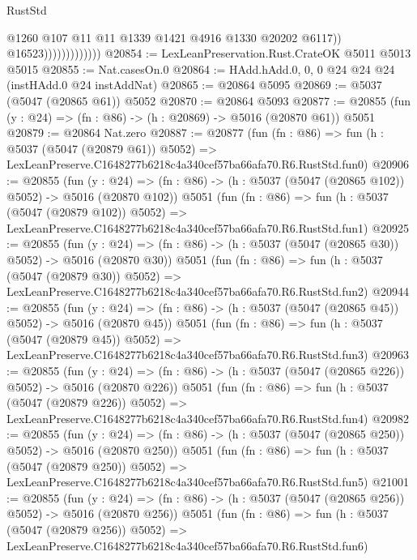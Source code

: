 \begin{lexlean}{RustStd}
\begin{coremodule}
                                  @1260
                                  @107
                                  @11
                                  @11
                                  @1339
                                  @1421
                                  @4916
                                  @1330
                                  @20202
                                  @6117))
                              @16523)))))))))))))
@20854 := LexLeanPreservation.Rust.CrateOK @5011 @5013 @5015
@20855 := Nat.casesOn.{0}
@20864 := HAdd.hAdd.{0, 0, 0} @24 @24 @24 (instHAdd.{0} @24 instAddNat)
@20865 := @20864 @5095
@20869 := @5037 (@5047 (@20865 @61)) @5052
@20870 := @20864 @5093
@20877 := @20855 (fun (y : @24) => (fn : @86) -> (h : @20869) -> @5016 (@20870 @61)) @5051
@20879 := @20864 Nat.zero
@20887 := @20877
    (fun (fn : @86) =>
    fun (h : @5037 (@5047 (@20879 @61)) @5052) =>
    LexLeanPreserve.C1648277b6218c4a340cef57ba66afa70.R6.RustStd.fun0)
@20906 := @20855
    (fun (y : @24) => (fn : @86) -> (h : @5037 (@5047 (@20865 @102)) @5052) -> @5016 (@20870 @102))
    @5051
    (fun (fn : @86) =>
    fun (h : @5037 (@5047 (@20879 @102)) @5052) =>
    LexLeanPreserve.C1648277b6218c4a340cef57ba66afa70.R6.RustStd.fun1)
@20925 := @20855
    (fun (y : @24) => (fn : @86) -> (h : @5037 (@5047 (@20865 @30)) @5052) -> @5016 (@20870 @30))
    @5051
    (fun (fn : @86) =>
    fun (h : @5037 (@5047 (@20879 @30)) @5052) =>
    LexLeanPreserve.C1648277b6218c4a340cef57ba66afa70.R6.RustStd.fun2)
@20944 := @20855
    (fun (y : @24) => (fn : @86) -> (h : @5037 (@5047 (@20865 @45)) @5052) -> @5016 (@20870 @45))
    @5051
    (fun (fn : @86) =>
    fun (h : @5037 (@5047 (@20879 @45)) @5052) =>
    LexLeanPreserve.C1648277b6218c4a340cef57ba66afa70.R6.RustStd.fun3)
@20963 := @20855
    (fun (y : @24) => (fn : @86) -> (h : @5037 (@5047 (@20865 @226)) @5052) -> @5016 (@20870 @226))
    @5051
    (fun (fn : @86) =>
    fun (h : @5037 (@5047 (@20879 @226)) @5052) =>
    LexLeanPreserve.C1648277b6218c4a340cef57ba66afa70.R6.RustStd.fun4)
@20982 := @20855
    (fun (y : @24) => (fn : @86) -> (h : @5037 (@5047 (@20865 @250)) @5052) -> @5016 (@20870 @250))
    @5051
    (fun (fn : @86) =>
    fun (h : @5037 (@5047 (@20879 @250)) @5052) =>
    LexLeanPreserve.C1648277b6218c4a340cef57ba66afa70.R6.RustStd.fun5)
@21001 := @20855
    (fun (y : @24) => (fn : @86) -> (h : @5037 (@5047 (@20865 @256)) @5052) -> @5016 (@20870 @256))
    @5051
    (fun (fn : @86) =>
    fun (h : @5037 (@5047 (@20879 @256)) @5052) =>
    LexLeanPreserve.C1648277b6218c4a340cef57ba66afa70.R6.RustStd.fun6)

\end{coremodule}
\end{lexlean}
